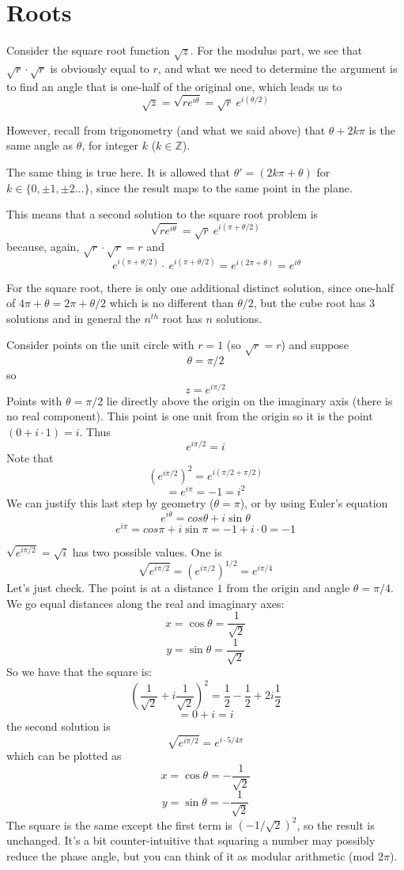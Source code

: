 \documentclass[11pt, oneside]{article}   	%
\begin{document}
\section{Roots}
Consider the square root function $\sqrt{z}$.  For the modulus part, we see that $\sqrt{r} \cdot \sqrt{r}$ is obviously equal to $r$, and what we need to determine the argument is to find an angle that is one-half of the original one, which leads us to
\[ \sqrt{z} = \sqrt{re^{i\theta}} = \sqrt{r} \ e^{i (\theta/2)} \]

However, recall from trigonometry (and what we said above) that $\theta + 2k \pi$ is the same angle as $\theta$, for integer $k$ ($k \in \mathbb{Z}$).

The same thing is true here.  It is allowed that $\theta ' = (2k \pi + \theta)$ for $k \in \{ 0, \pm 1, \pm 2 \dots \}$, since the result maps to the same point in the plane.

This means that a second solution to the square root problem is
\[ \sqrt{re^{i\theta}} = \sqrt{r} \ e^{i (\pi + \theta/2)} \]
because, again, $\sqrt{r} \cdot \sqrt{r} = r$ and
\[ \ e^{i (\pi + \theta/2)} \cdot \ e^{i (\pi + \theta/2)} = e^{i (2\pi + \theta)} = e^{i\theta} \]

For the square root, there is only one additional distinct solution, since one-half of $4 \pi + \theta = 2 \pi + \theta/2$ which is no different than $\theta/2$, but the cube root has 3 solutions and in general the $n^{th}$ root has $n$ solutions.

Consider points on the unit circle with $r=1$ (so $\sqrt{r} = r$) and suppose
\[ \theta = \pi/2 \]
so
\[ z = e^{i \pi/2} \]
Points with $\theta = \pi/2$ lie directly above the origin on the imaginary axis (there is no real component).  This point is one unit from the origin so it is the point $(0 + i \cdot 1) = i$.  Thus
\[ e^{i \pi/2} = i \]
Note that
\[ (e^{i \pi/2})^2 = e^{i (\pi/2 + \pi/2)}\]
\[ = e^{i\pi} = -1 = i^2 \]
We can justify this last step by geometry ($\theta = \pi$), or by using Euler's equation
\[ e^{i\theta} = cos \theta + i \sin \theta \]
\[ e^{i\pi} =  cos \pi + i \sin \pi = - 1 + i \cdot 0 = -1 \]

$\sqrt{e^{i \pi/2}} = \sqrt{i}$ has two possible values.  One is
\[ \sqrt{e^{i\pi/2}}  = (e^{i\pi/2})^{1/2} = e^{i\pi/4} \]
Let's just check.  The point is at a distance $1$ from the origin and angle $\theta = \pi/4$.  We go equal distances along the real and imaginary axes:
\[ x = \cos \theta = \frac{1}{\sqrt{2}} \]
\[ y = \sin \theta = \frac{1}{\sqrt{2}} \]
So we have that the square is:
\[ (\frac{1}{\sqrt{2}} + i \frac{1}{\sqrt{2}} )^2 = \frac{1}{2} - \frac{1}{2} + 2 i \frac{1}{2} \]
\[ = 0 + i = i \]
the second solution is
\[ \sqrt{e^{i\pi/2}}  = e^{i \cdot 5/4 \pi} \]
which can be plotted as
\[ x = \cos \theta = -\frac{1}{\sqrt{2}} \]
\[ y = \sin \theta = -\frac{1}{\sqrt{2}} \]
The square is the same except the first term is $(- 1/\sqrt{2})^2$, so the result is unchanged.  It's a bit counter-intuitive that squaring a number may possibly reduce the phase angle, but you can think of it as modular arithmetic (mod $2 \pi$).
\end{document}

